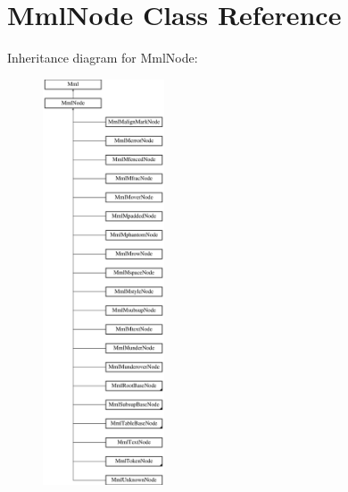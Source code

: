 \hypertarget{class_mml_node}{}\section{Mml\+Node Class Reference}
\label{class_mml_node}
Inheritance diagram for Mml\+Node\+:\begin{figure}[H]
\begin{center}
\leavevmode
\includegraphics[height=12.000000cm]{class_mml_node}
\end{center}
\end{figure}

